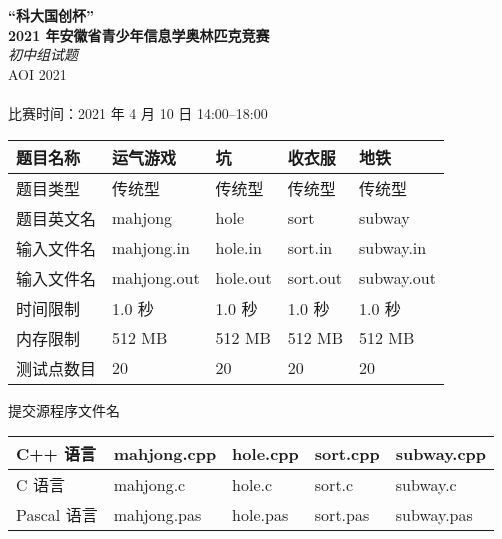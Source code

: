 \documentclass[11pt,a4paper,oneside]{article}
\begin{document}


\begin{center}
\textbf{\huge “科大国创杯”\\2021 年安徽省青少年信息学奥林匹克竞赛}\\
  {\LARGE \textit{初中组试题}\\
  AOI 2021\\~\\}
  {\Large 比赛时间：2021 年 4 月 10 日 14:00–18:00}
\end{center}

\begin{center}
\begin{tabular}{|l|l|l|l|l|}
\hline
题目名称&运气游戏&坑&收衣服&地铁\\
\hline
题目类型&传统型&传统型&传统型&传统型\\
\hline
题目英文名&\ttfamily mahjong&\ttfamily hole&\ttfamily sort&\ttfamily subway\\
\hline
输入文件名&\ttfamily mahjong.in&\ttfamily hole.in&\ttfamily sort.in&\ttfamily subway.in\\
\hline
输入文件名&\ttfamily mahjong.out&\ttfamily hole.out&\ttfamily sort.out&\ttfamily subway.out\\
\hline
时间限制&1.0 秒&1.0 秒&1.0 秒&1.0 秒\\
\hline
内存限制&512 MB&512 MB&512 MB&512 MB\\
\hline
测试点数目&20&20&20&20\\
\hline
\end{tabular}
\end{center}

提交源程序文件名

\begin{center}
\begin{tabular}{|l|l|l|l|l|}
\hline
C++ 语言 &\ttfamily mahjong.cpp&\ttfamily hole.cpp&\ttfamily sort.cpp&\ttfamily subway.cpp\\
\hline
C 语言 &\ttfamily mahjong.c&\ttfamily hole.c&\ttfamily sort.c&\ttfamily subway.c\\
\hline
Pascal 语言 &\ttfamily mahjong.pas&\ttfamily hole.pas&\ttfamily sort.pas&\ttfamily subway.pas\\
\hline
\end{tabular}
\end{center}
\end{document}
